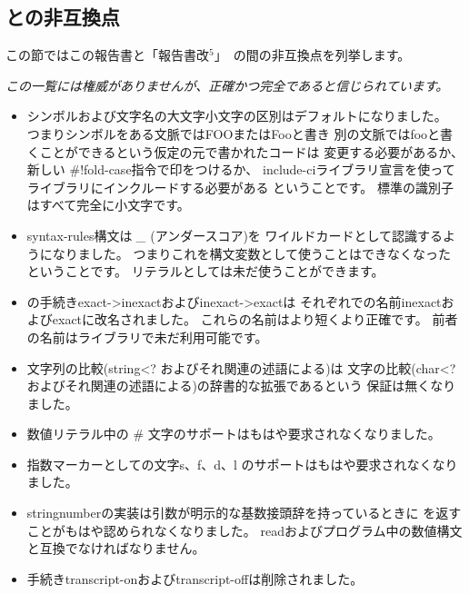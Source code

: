 

\subsection*{\rfivers{}との非互換点}
\label{incompatibilities}

この節ではこの報告書と「報告書改$^5$」~\cite{R5RS}の間の非互換点を列挙します。

{\em この一覧には権威がありませんが、正確かつ完全であると信じられています。}


\begin{itemize}

\item シンボルおよび文字名の大文字小文字の区別はデフォルトになりました。
つまりシンボルをある文脈では{\cf FOO}または{\cf Foo}と書き
別の文脈では{\cf foo}と書くことができるという仮定の元で書かれたコードは
変更する必要があるか、新しい {\cf \#!fold-case}指令で印をつけるか、
{\cf include-ci}ライブラリ宣言を使ってライブラリにインクルードする必要がある
ということです。
標準の識別子はすべて完全に小文字です。

\item {\cf syntax-rules}構文は {\em \_} (アンダースコア)を
ワイルドカードとして認識するようになりました。
つまりこれを構文変数として使うことはできなくなったということです。
リテラルとしては未だ使うことができます。

\item \rfivers{}の手続き{\cf exact->\+inexact}および{\cf inexact->\+exact}は
それぞれ\rsixrs{}での名前{\cf inexact}および{\cf exact}に改名されました。
これらの名前はより短くより正確です。
前者の名前は\rfivers{}ライブラリで未だ利用可能です。

\item 文字列の比較({\cf string<?} およびそれ関連の述語による)は
文字の比較({\cf char<?} およびそれ関連の述語による)の辞書的な拡張であるという
保証は無くなりました。

\item 数値リテラル中の \# 文字のサポートはもはや要求されなくなりました。

\item 指数マーカーとしての文字{\cf s}、{\cf f}、{\cf d}、{\cf l}
のサポートはもはや要求されなくなりました。

\item {\cf string\coerce{}number}の実装は引数が明示的な基数接頭辞を持っているときに %
\schfalse{}を返すことがもはや認められなくなりました。
{\cf read}およびプログラム中の数値構文と互換でなければなりません。

\item 手続き{\cf transcript-on}および{\cf transcript-off}は削除されました。

\end{itemize}

